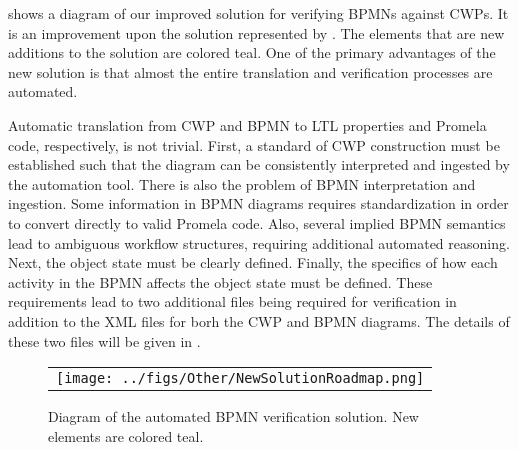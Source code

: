 \begin{comment}
Automatic translation from CWP and BPMN to LTL properties and Promela code, respectively, is not trivial. First, the edges of the CWP must follow a consistent expression language in order to be interpreted automatically. Next, the object state must be clearly defined. Also, several implied BPMN semantics lead to ambiguous workflow structures, requiring additional automated reasoning. Next, the complete conditions of decision gateways in the workflow must be expressed somewhere. Finally, the environment for running the workflow must be defined, including variables and behavior models for BPMN activities.
\end{comment}

 shows a diagram of our improved solution for verifying BPMNs against CWPs. It is an improvement upon the solution represented by . The elements that are new additions to the solution are colored teal. One of the primary advantages of the new solution is that almost the entire translation and verification processes are automated.

Automatic translation from CWP and BPMN to LTL properties and Promela code, respectively, is not trivial. First, a standard of CWP construction must be established such that the diagram can be consistently interpreted and ingested by the automation tool. There is also the problem of BPMN interpretation and ingestion. Some information in BPMN diagrams requires standardization in order to convert directly to valid Promela code. Also, several implied BPMN semantics lead to ambiguous workflow structures, requiring additional automated reasoning. Next, the object state must be clearly defined. Finally, the specifics of how each activity in the BPMN affects the object state must be defined. These requirements lead to two additional files being required for verification in addition to the XML files for borh the CWP and BPMN diagrams. The details of these two files will be given in .

\begin{figure*}[t]
  \begin{center}
    \begin{tabular}{c}
        \texttt{[image: ../figs/Other/NewSolutionRoadmap.png]}
    \end{tabular}
  \end{center}
\caption{Diagram of the automated BPMN verification solution. New elements are colored teal.}
\label{fig:newSolutionRoadmap}
\end{figure*}
